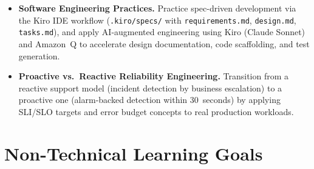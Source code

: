 \begin{itemize}
    \item \textbf{Software Engineering Practices.}
          Practice spec-driven development via the Kiro IDE workflow
          (\texttt{.kiro/specs/} with \texttt{requirements.md},
          \texttt{design.md}, \texttt{tasks.md}), and apply AI-augmented
          engineering using Kiro (Claude Sonnet) and Amazon~Q to
          accelerate design documentation, code scaffolding, and test
          generation.

    \item \textbf{Proactive vs.\ Reactive Reliability Engineering.}
          Transition from a reactive support model (incident detection by
          business escalation) to a proactive one (alarm-backed detection
          within 30~seconds) by applying SLI/SLO targets and error budget
          concepts to real production workloads.

\end{itemize}

\section{Non-Technical Learning Goals}

